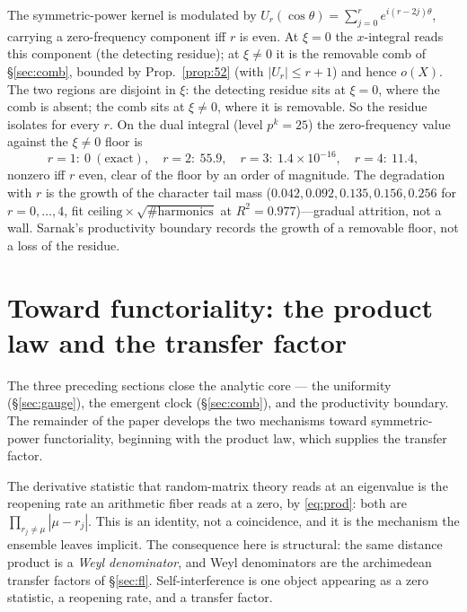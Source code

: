 \documentclass[11pt]{article}
\theoremstyle{definition}
\begin{document}
The symmetric-power kernel is modulated by $U_r(\cos\theta)=\sum_{j=0}^r e^{i(r-2j)\theta}$, carrying
a zero-frequency component iff $r$ is even. At $\xi=0$ the $x$-integral reads this component (the
detecting residue); at $\xi\neq0$ it is the removable comb of \S\ref{sec:comb}, bounded by
Prop.~\ref{prop:52} (with $|U_r|\le r+1$) and hence $o(X)$. The two regions are disjoint in $\xi$:
the detecting residue sits at $\xi=0$, where the comb is absent; the comb sits at $\xi\neq0$, where it
is removable. So the residue isolates for every $r$. On the dual integral (level $p^k=25$) the
zero-frequency value against the $\xi\neq0$ floor is
\[
  r=1:\ 0\ (\text{exact}),\quad r=2:\ 55.9,\quad r=3:\ 1.4\times10^{-16},\quad r=4:\ 11.4,
\]
nonzero iff $r$ even, clear of the floor by an order of magnitude. The degradation with $r$ is the
growth of the character tail mass ($0.042,0.092,0.135,0.156,0.256$ for $r=0,\dots,4$, fit
$\text{ceiling}\times\sqrt{\#\text{harmonics}}$ at $R^2=0.977$)---gradual attrition, not a wall.
Sarnak's productivity boundary \cite[fn.~5]{AltIII} records the growth of a removable floor, not a
loss of the residue.

\section{Toward functoriality: the product law and the transfer factor}\label{sec:gue}

The three preceding sections close the analytic core --- the uniformity (\S\ref{sec:gauge}), the
emergent clock (\S\ref{sec:comb}), and the productivity boundary. The remainder of the paper develops
the two mechanisms toward symmetric-power functoriality, beginning with the product law, which supplies
the transfer factor.

The derivative statistic that random-matrix theory reads at an eigenvalue is the reopening rate an
arithmetic fiber reads at a zero, by \eqref{eq:prod}: both are $\prod_{r_j\neq\mu}|\mu-r_j|$. This is
an identity, not a coincidence, and it is the mechanism the ensemble leaves implicit. The consequence
here is structural: the same distance product is a \emph{Weyl denominator}, and Weyl denominators are
the archimedean transfer factors of \S\ref{sec:fl}. Self-interference is one object appearing as a
zero statistic, a reopening rate, and a transfer factor.
\end{document}
